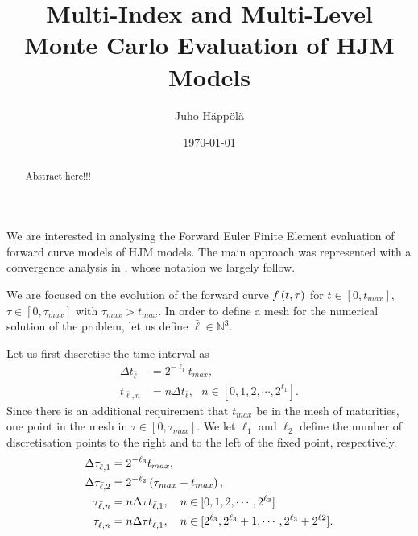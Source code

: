 \documentclass[11pt]{amsart}
\title[MIMC and MLMC HJM]{Multi-Index and Multi-Level Monte Carlo Evaluation of HJM Models}
\author{Juho H\"app\"ol\"a}
\date{\today}
\begin{document}
\begin{abstract}
Abstract here!!!
\end{abstract}

\maketitle



We are interested in analysing the Forward Euler Finite Element evaluation of forward curve models of HJM models. The main approach was represented with a convergence analysis in \cite{bjork2013monte}, whose notation we largely follow.

We are focused on the evolution of the forward curve $f \left( {t , \tau} \right)$ for $t \in [0,t_{max}]$, $\tau \in [0,\tau_{max}]$ with $\tau_{max}>t_{max}$. In order to define a mesh for the numerical solution of the problem, let us define $\bar \ell \in \mathbb{N}^3$.

Let us first discretise the time interval as
\begin{align*}
\Delta t_{\bar \ell} &= 2^{-\ell_1} t_{max},
\\
t_{\bar \ell, n} &= n \Delta t_{\bar \ell}, ~~~ n \in [0,1,2,\cdots, 2^{\ell_1}].
\end{align*}
Since there is an additional requirement that $t_{max}$ be in
the mesh of maturities, one point in the mesh in $\tau \in [0,\tau_{max}]$. We let $\ell_1$ and $\ell_2$ define the number of discretisation points to the right and to the left of the fixed
point, respectively.
\begin{align*}
\Delta \tau_{\bar \ell,1} &= 2^{-\ell_3} t_{max},  \\
\Delta \tau_{\bar \ell,2} &= 2^{-\ell_2} \left( {\tau_{max}-t_{max}} \right), \\
\tau_{\bar \ell, n} &= n \Delta \tau t_{\bar \ell,1}, ~~~ n \in [0,1,2,\cdots, 2^{\ell_3}] \\
\tau_{\bar \ell, n} &= n \Delta \tau t_{\bar \ell,1}, ~~~ n \in [2^{\ell_3},2^{\ell_3}+1,\cdots, 2^{\ell_3}+2^{\ell 2}].
\end{align*}
\end{document}
